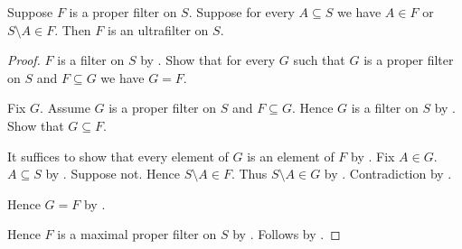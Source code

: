 \begin{theorem}\label{filter_decision_implies_ultrafilter}
    Suppose $F$ is a proper filter on $S$.
    Suppose for every $A\subseteq S$ we have
        $A\in F$ or $S\setminus A\in F$.
    Then $F$ is an ultrafilter on $S$.
\end{theorem}
\begin{proof}
    $F$ is a filter on $S$ by .
    Show that for every $G$ such that $G$ is a proper filter on $S$ and
        $F\subseteq G$ we have $G=F$.
    \begin{subproof}
        Fix $G$.
        Assume $G$ is a proper filter on $S$ and $F\subseteq G$.
        Hence $G$ is a filter on $S$ by .
        Show that $G\subseteq F$.
        \begin{subproof}
            It suffices to show that every element of $G$ is an element of
                $F$ by .
            Fix $A\in G$.
            $A\subseteq S$ by .
            Suppose not.
            Hence $S\setminus A\in F$.
            Thus $S\setminus A\in G$ by .
            Contradiction by .
        \end{subproof}
        Hence $G=F$ by .
    \end{subproof}
    Hence $F$ is a maximal proper filter on $S$
        by .
    Follows by .
\end{proof}

